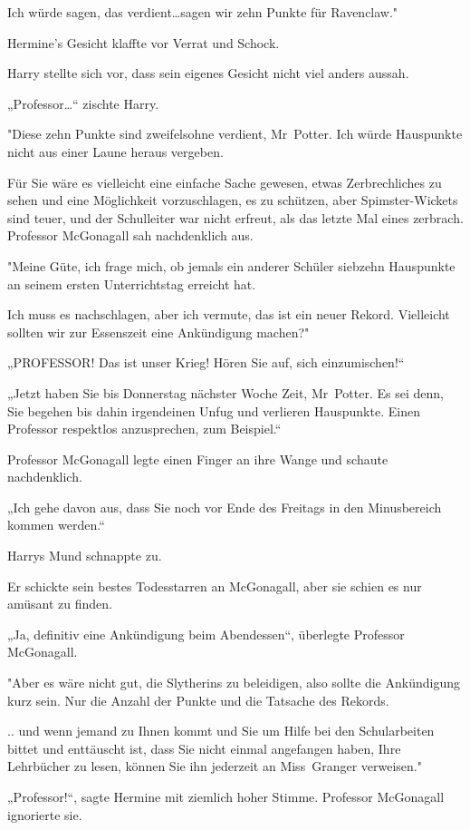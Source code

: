 {Ich würde sagen, das verdient…sagen wir zehn Punkte für Ravenclaw."

Hermine's Gesicht klaffte vor Verrat und Schock.

Harry stellte sich vor, dass sein eigenes Gesicht nicht viel anders aussah.

„Professor…“ zischte Harry.

"Diese zehn Punkte sind zweifelsohne verdient, Mr~Potter. Ich würde Hauspunkte nicht aus einer Laune heraus vergeben.

Für Sie wäre es vielleicht eine einfache Sache gewesen, etwas Zerbrechliches zu sehen und eine Möglichkeit vorzuschlagen, es zu schützen, aber Spimster-Wickets sind teuer, und der Schulleiter war nicht erfreut, als das letzte Mal eines zerbrach. Professor McGonagall sah nachdenklich aus.

"Meine Güte, ich frage mich, ob jemals ein anderer Schüler siebzehn Hauspunkte an seinem ersten Unterrichtstag erreicht hat.

Ich muss es nachschlagen, aber ich vermute, das ist ein neuer Rekord. Vielleicht sollten wir zur Essenszeit eine Ankündigung machen?"

„PROFESSOR! Das ist unser Krieg! Hören Sie auf, sich einzumischen!“

„Jetzt haben Sie bis Donnerstag nächster Woche Zeit, Mr~Potter. Es sei denn, Sie begehen bis dahin irgendeinen Unfug und verlieren Hauspunkte. Einen Professor respektlos anzusprechen, zum Beispiel.“

Professor McGonagall legte einen Finger an ihre Wange und schaute nachdenklich.

„Ich gehe davon aus, dass Sie noch vor Ende des Freitags in den Minusbereich kommen werden.“

Harrys Mund schnappte zu.

Er schickte sein bestes Todesstarren an McGonagall, aber sie schien es nur amüsant zu finden.

„Ja, definitiv eine Ankündigung beim Abendessen“, überlegte Professor McGonagall.

"Aber es wäre nicht gut, die Slytherins zu beleidigen, also sollte die Ankündigung kurz sein. Nur die Anzahl der Punkte und die Tatsache des Rekords.

.. und wenn jemand zu Ihnen kommt und Sie um Hilfe bei den Schularbeiten bittet und enttäuscht ist, dass Sie nicht einmal angefangen haben, Ihre Lehrbücher zu lesen, können Sie ihn jederzeit an Miss~Granger verweisen."

„Professor!“, sagte Hermine mit ziemlich hoher Stimme. Professor McGonagall ignorierte sie.

}
